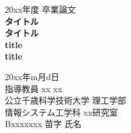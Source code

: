 \documentclass[12pt,a4j]{ujreport}
\begin{document}
\thispagestyle{empty} %
\begin{center}

\vspace{20mm}
{\Large\noindent 20xx年度 卒業論文}\\
\vspace{40mm}
{\huge\noindent\textbf{タイトル}}\\ %
\medskip
{\huge\noindent\textbf{タイトル}}\\ %
\vspace{\baselineskip}
{\huge\noindent\textbf{title}}\\ %
\medskip
{\huge\noindent\textbf{title}}\\ %
\vspace{40mm}

{\Large\noindent
20xx年m月d日\\
\vspace{\baselineskip}
指導教員 xx xx    \\
\vspace{\baselineskip}
公立千歳科学技術大学 理工学部\\
情報システム工学科 xx研究室\\
\vspace{\baselineskip}
Bxxxxxxx 苗字 氏名\\
}
\vspace{40mm}

\end{center}

\clearpage %

\tableofcontents
\clearpage

\lhead{\rightmark}
\renewcommand{\chaptermark}[1]{\markboth{第\ \normalfont\thechapter\ 章~~#1}{}}

\end{document}
